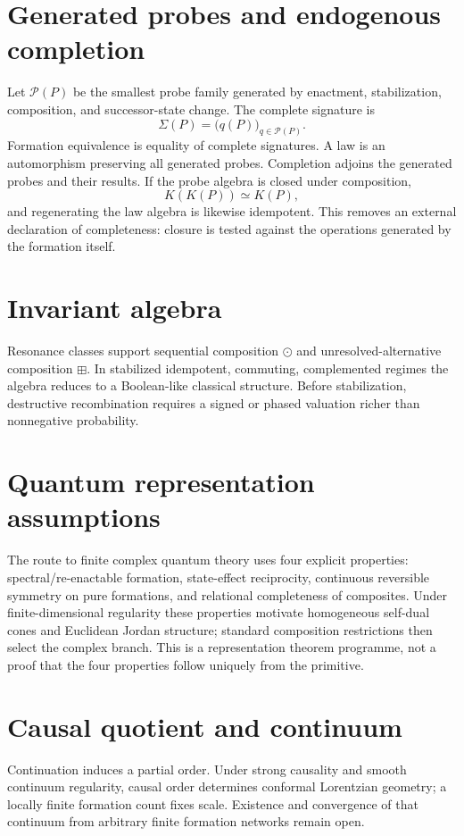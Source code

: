 \documentclass[11pt,a4paper]{article}
\begin{document}
\section{Generated probes and endogenous completion}
Let $\mathcal P(P)$ be the smallest probe family generated by enactment, stabilization, composition, and successor-state change. The complete signature is
\begin{equation}
\Sigma(P)=\bigl(q(P)\bigr)_{q\in\mathcal P(P)}.
\end{equation}
Formation equivalence is equality of complete signatures. A law is an automorphism preserving all generated probes. Completion adjoins the generated probes and their results. If the probe algebra is closed under composition,
\begin{equation}
K(K(P))\simeq K(P),
\end{equation}
and regenerating the law algebra is likewise idempotent. This removes an external declaration of completeness: closure is tested against the operations generated by the formation itself.

\section{Invariant algebra}
Resonance classes support sequential composition $\odot$ and unresolved-alternative composition $\boxplus$. In stabilized idempotent, commuting, complemented regimes the algebra reduces to a Boolean-like classical structure. Before stabilization, destructive recombination requires a signed or phased valuation richer than nonnegative probability.

\section{Quantum representation assumptions}
The route to finite complex quantum theory uses four explicit properties: spectral/re-enactable formation, state-effect reciprocity, continuous reversible symmetry on pure formations, and relational completeness of composites. Under finite-dimensional regularity these properties motivate homogeneous self-dual cones and Euclidean Jordan structure; standard composition restrictions then select the complex branch. This is a representation theorem programme, not a proof that the four properties follow uniquely from the primitive.

\section{Causal quotient and continuum}
Continuation induces a partial order. Under strong causality and smooth continuum regularity, causal order determines conformal Lorentzian geometry; a locally finite formation count fixes scale. Existence and convergence of that continuum from arbitrary finite formation networks remain open.
\end{document}
